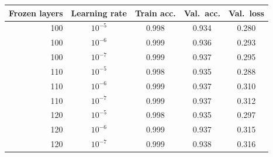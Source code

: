 \begin{tabular}{rcccc}
\toprule
Frozen layers & Learning rate & Train acc. & Val.\ acc. & Val.\ loss \\
\midrule
100 & $10^{-5}$ & 0.998 & 0.934 & 0.280 \\
100 & $10^{-6}$ & 0.999 & 0.936 & 0.293 \\
100 & $10^{-7}$ & 0.999 & 0.937 & 0.295 \\
110 & $10^{-5}$ & 0.998 & 0.935 & 0.288 \\
110 & $10^{-6}$ & 0.999 & 0.937 & 0.310 \\
110 & $10^{-7}$ & 0.999 & 0.937 & 0.312 \\
120 & $10^{-5}$ & 0.998 & 0.935 & 0.297 \\
120 & $10^{-6}$ & 0.999 & 0.937 & 0.315 \\
120 & $10^{-7}$ & 0.999 & 0.938 & 0.316 \\
\bottomrule
\end{tabular}

